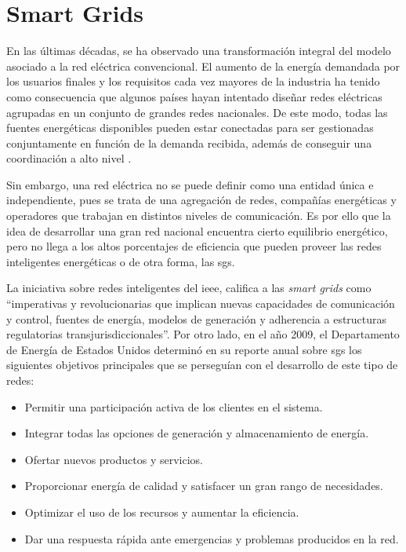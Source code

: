 \section{Smart Grids}
\label{sec:smartgrids}


En las últimas décadas, se ha observado una transformación integral del modelo asociado a la red eléctrica convencional. El aumento de la energía demandada por los usuarios finales y los requisitos cada vez mayores de la industria ha tenido como consecuencia que algunos países hayan intentado diseñar redes eléctricas agrupadas en un conjunto de grandes redes nacionales. De este modo, todas las fuentes energéticas disponibles pueden estar conectadas para ser gestionadas conjuntamente en función de la demanda recibida, además de conseguir una coordinación a alto nivel \cite{smartgrid_overview}.

\vspace{3mm}

Sin embargo, una red eléctrica no se puede definir como una entidad única e independiente, pues se trata de una agregación de redes, compañías energéticas y operadores que trabajan en distintos niveles de comunicación. Es por ello que la idea de desarrollar una gran red nacional encuentra cierto equilibrio energético, pero no llega a los altos porcentajes de eficiencia que pueden proveer las redes inteligentes energéticas o de otra forma, las \acrfull{sgs}. 

\vspace{3mm}

La iniciativa sobre redes inteligentes del \gls{ieee}, califica a las \textit{smart grids} \cite{ieee} como ``imperativas y revolucionarias que implican nuevas capacidades de comunicación y control, fuentes de energía, modelos de generación y adherencia a estructuras regulatorias transjurisdiccionales''. Por otro lado, en el año 2009, el Departamento de Energía de Estados Unidos \cite{us} determinó en su reporte anual sobre \gls{sg}s los siguientes objetivos principales que se perseguían con el desarrollo de este tipo de redes: 

\begin{itemize}
  \item Permitir una participación activa de los clientes en el sistema.
  \item Integrar todas las opciones de generación y almacenamiento de energía.
  \item Ofertar nuevos productos y servicios.
  \item Proporcionar energía de calidad y satisfacer un gran rango de necesidades.
  \item Optimizar el uso de los recursos y aumentar la eficiencia.
  \item Dar una respuesta rápida ante emergencias y problemas producidos en la red.
\end{itemize}

